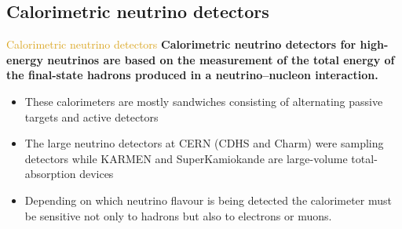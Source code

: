 \documentclass[11pt]{beamer} %
\renewcommand{\(}{\begin{columns}}
\renewcommand{\)}{\end{columns}}
\newcommand{\<}[1]{\begin{column}{#1}}
\renewcommand{\>}{\end{column}}
\newcommand{\itt}{\begin{itemize}}
\newcommand{\tti}{\end{itemize}}
\newcommand{\hlt}[2]{\textcolor{#1}{\textbf{#2}}}
\begin{document}
\subsection{Calorimetric neutrino detectors}
\begin{frame}{\textcolor{Goldenrod}{Calorimetric neutrino detectors}}
  \hlt{RoyalPurple}{Calorimetric neutrino detectors for high-energy neutrinos are based
    on the measurement of the total energy of the final-state hadrons
    produced in a neutrino–nucleon interaction.}
  
  \itt
\item<2-> These calorimeters are
  mostly sandwiches consisting of alternating passive targets and
  active detectors


\item<3-> The large neutrino detectors at CERN (CDHS and
  Charm) were sampling detectors while KARMEN and SuperKamiokande are
  large-volume total-absorption devices
  
  
\item<4-> \alert{Depending on which neutrino flavour
  is being detected the calorimeter must be sensitive not only to
  hadrons but also to electrons or muons.}
\tti  
  
\end{frame}
\end{document}
